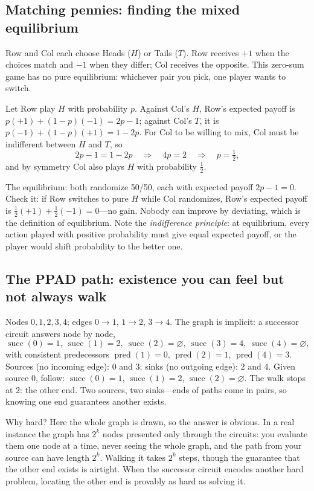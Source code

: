 \subsection{Matching pennies: finding the mixed equilibrium}

Row and Col each choose Heads ($H$) or Tails ($T$). Row receives $+1$ when the choices match and $-1$ when they differ; Col receives the opposite. This zero-sum game has no pure equilibrium: whichever pair you pick, one player wants to switch.

Let Row play $H$ with probability $p$. Against Col's $H$, Row's expected payoff is $p(+1)+(1-p)(-1)=2p-1$; against Col's $T$, it is $p(-1)+(1-p)(+1)=1-2p$. For Col to be willing to mix, Col must be indifferent between $H$ and $T$, so
\[
2p-1=1-2p \quad\Longrightarrow\quad 4p=2 \quad\Longrightarrow\quad p=\tfrac12,
\]
and by symmetry Col also plays $H$ with probability $\tfrac12$.

The equilibrium: both randomize 50/50, each with expected payoff $2p-1=0$. Check it: if Row switches to pure $H$ while Col randomizes, Row's expected payoff is $\tfrac12(+1)+\tfrac12(-1)=0$---no gain. Nobody can improve by deviating, which is the definition of equilibrium. Note the \emph{indifference principle}: at equilibrium, every action played with positive probability must give equal expected payoff, or the player would shift probability to the better one.

\subsection{The PPAD path: existence you can feel but not always walk}

Nodes $0,1,2,3,4$; edges $0\to1$, $1\to2$, $3\to4$. The graph is implicit: a successor circuit answers node by node,
\[
\operatorname{succ}(0)=1,\ \operatorname{succ}(1)=2,\ \operatorname{succ}(2)=\varnothing,\ \operatorname{succ}(3)=4,\ \operatorname{succ}(4)=\varnothing,
\]
with consistent predecessors $\operatorname{pred}(1)=0$, $\operatorname{pred}(2)=1$, $\operatorname{pred}(4)=3$. Sources (no incoming edge): $0$ and $3$; sinks (no outgoing edge): $2$ and $4$. Given source $0$, follow: $\operatorname{succ}(0)=1$, $\operatorname{succ}(1)=2$, $\operatorname{succ}(2)=\varnothing$. The walk stops at $2$: the other end. Two sources, two sinks---ends of paths come in pairs, so knowing one end guarantees another exists.

Why hard? Here the whole graph is drawn, so the answer is obvious. In a real instance the graph has $2^k$ nodes presented only through the circuits: you evaluate them one node at a time, never seeing the whole graph, and the path from your source can have length $2^k$. Walking it takes $2^k$ steps, though the guarantee that the other end exists is airtight. When the successor circuit encodes another hard problem, locating the other end is provably as hard as solving it.

